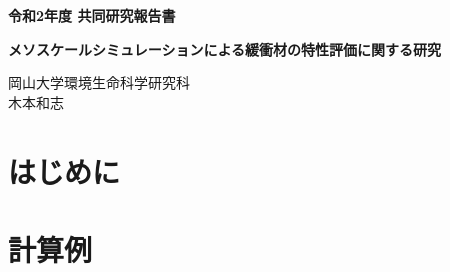 ﻿\documentclass[11pt,a4j]{jarticle}
\newlength{\minitwocolumn}
\begin{document}
\newcommand{\fat}[1]{\mbox{\boldmath $#1$}}
\newcommand{\D}{\partial}
\newcommand{\w}{\omega}
\newcommand{\ga}{\alpha}
\newcommand{\gb}{\beta}
\newcommand{\gx}{\xi}
\newcommand{\gz}{\zeta}
\newcommand{\vhat}[1]{\hat{\fat{#1}}}
\newcommand{\spc}{\vspace{0.7\baselineskip}}
\newcommand{\halfspc}{\vspace{0.3\baselineskip}}

\newcommand{\twofig}[2]
 {
   \begin{figure}[h]
     \begin{minipage}[t]{\minitwocolumn}
         \begin{center}   #1
         \end{center}
     \end{minipage}
         \hspace{\columnsep}
     \begin{minipage}[t]{\minitwocolumn}
         \begin{center} #2
         \end{center}
     \end{minipage}
   \end{figure}
 }
\begin{center}
{\Large \bf 令和2年度 共同研究報告書}
\end{center}
\vspace{2mm}
\begin{center}
{\LARGE \bf 
メソスケールシミュレーションによる緩衝材の特性評価に関する研究} 
\end{center}
\begin{center}
岡山大学環境生命科学研究科\\
木本和志
\end{center}
\vspace{10mm}
\section{はじめに}



\section{計算例}
%
\end{document}
